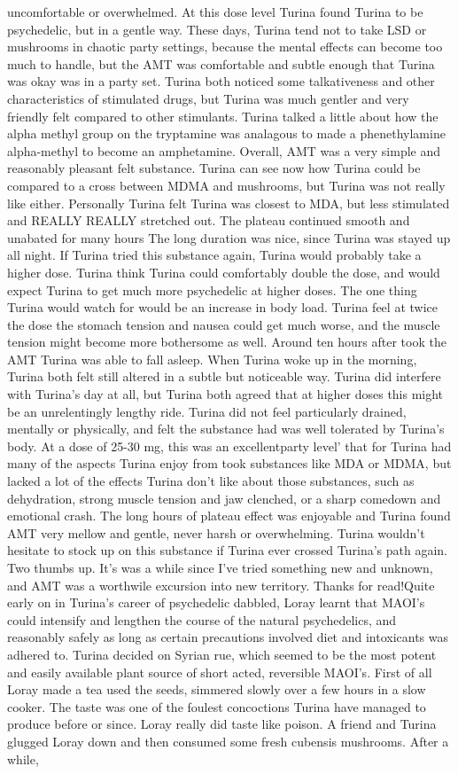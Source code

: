 \documentclass[12pt]{book}
\begin{document}
uncomfortable or overwhelmed. At this dose level Turina found Turina to be psychedelic, but in a gentle way. These days, Turina tend not to take LSD or mushrooms in chaotic party settings, because the mental effects can become too much to handle, but the AMT was comfortable and subtle enough that Turina was okay was in a party set. Turina both noticed some talkativeness and other characteristics of stimulated drugs, but Turina was much gentler and very friendly felt compared to other stimulants. Turina talked a little about how the alpha methyl group on the tryptamine was analagous to made a phenethylamine alpha-methyl to become an amphetamine. Overall, AMT was a very simple and reasonably pleasant felt substance. Turina can see now how Turina could be compared to a cross between MDMA and mushrooms, but Turina was not really like either. Personally Turina felt Turina was closest to MDA, but less stimulated and REALLY REALLY stretched out. The plateau continued smooth and unabated for many hours The long duration was nice, since Turina was stayed up all night. If Turina tried this substance again, Turina would probably take a higher dose. Turina think Turina could comfortably double the dose, and would expect Turina to get much more psychedelic at higher doses. The one thing Turina would watch for would be an increase in body load. Turina feel at twice the dose the stomach tension and nausea could get much worse, and the muscle tension might become more bothersome as well. Around ten hours after took the AMT Turina was able to fall asleep. When Turina woke up in the morning, Turina both felt still altered in a subtle but noticeable way. Turina did interfere with Turina's day at all, but Turina both agreed that at higher doses this might be an unrelentingly lengthy ride. Turina did not feel particularly drained, mentally or physically, and felt the substance had was well tolerated by Turina's body. At a dose of 25-30 mg, this was an excellentparty level' that for Turina had many of the aspects Turina enjoy from took substances like MDA or MDMA, but lacked a lot of the effects Turina don't like about those substances, such as dehydration, strong muscle tension and jaw clenched, or a sharp comedown and emotional crash. The long hours of plateau effect was enjoyable and Turina found AMT very mellow and gentle, never harsh or overwhelming. Turina wouldn't hesitate to stock up on this substance if Turina ever crossed Turina's path again. Two thumbs up. It's was a while since I've tried something new and unknown, and AMT was a worthwile excursion into new territory. Thanks for read!Quite early on in Turina's career of psychedelic dabbled, Loray learnt that MAOI's could intensify and lengthen the course of the natural psychedelics, and reasonably safely as long as certain precautions involved diet and intoxicants was adhered to. Turina decided on Syrian rue, which seemed to be the most potent and easily available plant source of short acted, reversible MAOI's. First of all Loray made a tea used the seeds, simmered slowly over a few hours in a slow cooker. The taste was one of the foulest concoctions Turina have managed to produce before or since. Loray really did taste like poison. A friend and Turina glugged Loray down and then consumed some fresh cubensis mushrooms. After a while, 
\end{document}
